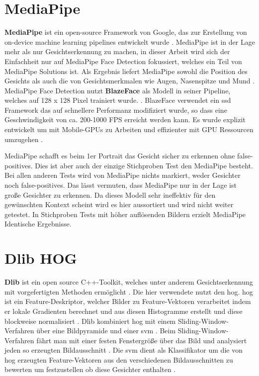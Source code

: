 \section{MediaPipe}
\textbf{MediaPipe} ist ein open-source Framework von Google, das zur Erstellung von on-device machine learning pipelines entwickelt wurde \parencite{mediapipeFramework, mediapipeSolutions}. MediaPipe ist in der Lage mehr als nur Gesichtserkennung zu machen, in dieser Arbeit wird sich der Einfachheit nur auf MediaPipe Face Detection fokussiert, welches ein Teil von MediaPipe Solutions ist. Als Ergebnis liefert MediaPipe sowohl die Position des Gesichts als auch die von Gesichtsmerkmalen wie Augen, Nasenspitze und Mund \parencite{mediapipeFace}. MediaPipe Face Detection nutzt \textbf{BlazeFace} als Modell in seiner Pipeline, welches auf 128 x 128 Pixel trainiert wurde. \parencite{mediapipeFace}. BlazeFace verwendet ein \gls{ssd} Framework das auf schnellere Performanz modifiziert wurde, so dass eine Geschwindigkeit von ca. 200-1000 FPS erreicht werden kann. Es wurde explizit entwickelt um mit Mobile-GPUs zu Arbeiten und effizienter mit GPU Ressourcen umzugehen \parencite{Bazarevsky2019}.

MediaPipe schafft es beim 1er Portrait das Gesicht sicher zu erkennen ohne false-positives. Dies ist aber auch der einzige Stichproben Test den MediaPipe besteht. Bei allen anderen Tests wird von MediaPipe nichts markiert, weder Gesichter noch false-positives. Das lässt vermuten, dass MediaPipe nur in der Lage ist große Gesichter zu erkennen. Da dieses Modell sehr ineffektiv für den gewünschten Kontext scheint wird es hier aussortiert und wird nicht weiter getestet. In Stichproben Tests mit höher auflösenden Bildern erzielt MediaPipe Identische Ergebnisse.

\section{Dlib HOG}
\textbf{Dlib} ist ein open source C++-Toolkit, welches unter anderem Gesichtserkennung mit vorgefertigten Methoden ermöglicht \parencite{dlib2022}. Die hier verwendete \texttt{} nutzt den \gls{hog}. \gls{hog} ist ein Feature-Deskriptor, welcher Bilder zu Feature-Vektoren verarbeitet indem er lokale Gradienten berechnet und aus diesen Histogramme erstellt und diese blockweise normalisiert \parencite{1467360}. Dlib kombiniert \gls{hog} mit einem Sliding-Window-Verfahren über eine Bildpyramide und einer \gls{svm} \parencite{trainObjectDetectoroD, faceDetectoroD}. Beim Sliding-Window-Verfahren fährt man mit einer festen Fenstergröße über das Bild und analysiert jeden so erzeugten Bildausschnitt \parencite{Esri2025SSD}. Die \gls{svm} dient als Klassifikator um die von \gls{hog} erzeugten Feature-Vektoren aus den verschiedenen Bildausschnitten zu bewerten um festzustellen ob diese Gesichter enthalten \parencite{1467360}.

